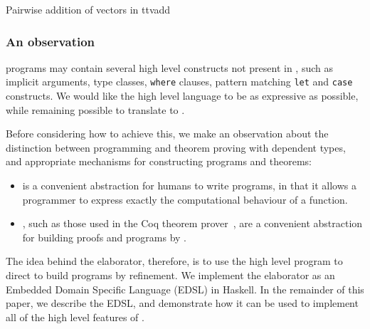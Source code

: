 {Pairwise addition of vectors in \TT{}}
{ttvadd}

\subsubsection{An observation}

\Idris{} programs may contain several high level constructs not present in \TT{}, such
as implicit arguments, type classes, \texttt{where} clauses, pattern matching \texttt{let}
and \texttt{case} constructs. We would like the high level language to be as expressive
as possible, while remaining possible to translate to \TT{}.

Before considering how to achieve this, we make an observation about the distinction between
programming and theorem proving with dependent types, and appropriate mechanisms for
constructing programs and theorems:

\begin{itemize}
\item {} is a convenient abstraction for humans to write programs,
in that it allows a programmer to express exactly the computational behaviour of a function.
\item {}, such as those used in the Coq theorem prover~\cite{Bertot2004},
are a convenient abstraction for building proofs and programs by .
\end{itemize}

The idea behind the \Idris{} elaborator, therefore, is to use the high level program
to direct  to build \TT{} programs by refinement. We implement the
elaborator as an Embedded Domain Specific Language (EDSL) in Haskell. 
In the remainder
of this paper, we describe the EDSL, and demonstrate how it can be used to implement
all of the high level features of \Idris{}.



